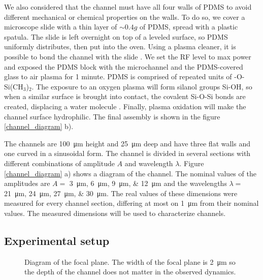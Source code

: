 We also considered that the channel must have all four walls of PDMS to avoid different mechanical or chemical properties on the walls. To do so, we cover a microscope slide with a thin layer of $\sim0.4g$ of PDMS, spread with a plastic spatula. The slide is left overnight on top of a leveled surface, so PDMS uniformly distributes, then put into the oven. Using a plasma cleaner, it is possible to bond the channel with the slide \cite{Henry2015ScholarlyCommonsProtocol-Technics}. We set the RF level to max power and exposed the PDMS block with the microchannel and the PDMS-covered glass to air plasma for 1 minute. PDMS is comprised of repeated units of -O-Si(CH$_3$)$_2$. The exposure to an oxygen plasma will form silanol groups Si-OH, so when a similar surface is brought into contact, the covalent Si-O-Si bonds are created, displacing a water molecule \cite{Koh2012QuantitativeEffect}. Finally, plasma oxidation will make the channel surface hydrophilic. The final assembly is shown in the figure \ref{channel_diagram} b).

The channels are \SI{100}{\micro\meter} height and \SI{25}{\micro\meter} deep and have three flat walls and one curved in a sinusoidal form. The channel is divided in several sections with different combinations of amplitude $A$ and wavelength $\lambda$. Figure \ref{channel_diagram} a) shows a diagram of the channel. The nominal values of the amplitudes are  $A=$ \SIlist[list-units=single, list-final-separator = {, }]{3;6;9;12}{\micro\meter} and the wavelengths $\lambda=$ \SIlist[list-units=single, list-final-separator = {, }]{21;24;27;30}{\micro\meter}. The real values of these dimensions were measured for every channel section, differing at most on \SI{1}{\micro\meter} from their nominal values. The measured dimensions will be used to characterize channels. 


\subsection{Experimental setup}

\begin{figure}
\centering

\caption[Focal plane diagram]{Diagram of the focal plane. The width of the focal plane is \SI{2}{\micro\meter} so the depth of the channel does not matter in the observed dynamics. }
\label{focal_plane}
\end{figure}

